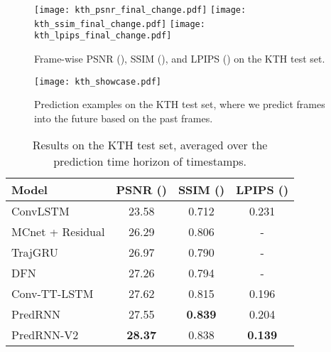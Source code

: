 \documentclass[10pt,journal,compsoc]{IEEEtran}
\let\MYoriglatexcaption\caption
\renewcommand{\caption}[2][\relax]{\MYoriglatexcaption[#2]{#2}}
\begin{document}
\begin{figure*}[t]
  \centering
{
    \texttt{[image: kth\_psnr\_final\_change.pdf]}
  }
  \hfil
{
    \texttt{[image: kth\_ssim\_final\_change.pdf]}
}
\hfil
{
    \texttt{[image: kth\_lpips\_final\_change.pdf]}
}
\caption{Frame-wise PSNR (), SSIM (), and LPIPS () on the KTH test set.}
\label{fig:kth_frame}
\vspace{5pt}
\end{figure*}


\begin{figure*}[t]
  \centering
  \texttt{[image: kth\_showcase.pdf]}
\caption{Prediction examples on the KTH test set, where we predict  frames into the future based on the past  frames.}
  \label{fig:kth_results}
  \vspace{5pt}
\end{figure*} 



\begin{table}[h]
\vspace{5pt}
  \caption{Results on the KTH test set, averaged over the prediction time horizon of  timestamps. }
  \vskip -0.05in
  \label{tab:kth}
  \centering
  \begin{tabular}{lccc}
    \toprule
    Model & PSNR () & SSIM () & LPIPS ()  \\
    \midrule
    ConvLSTM \cite{shi2015convolutional} & 23.58 & 0.712 & 0.231 \\
    MCnet + Residual \cite{Villegas2017Decomposing} & 26.29 & 0.806 & - \\
    TrajGRU \cite{shi2017deep} & 26.97 & 0.790 & - \\
    DFN \cite{de2016dynamic} & 27.26 & 0.794 & - \\
    Conv-TT-LSTM \cite{su2020convolutional} & 27.62 & 0.815 & 0.196 \\
    \midrule
    PredRNN & 27.55 & \textbf{0.839} & 0.204  \\
    PredRNN-V2 & \textbf{28.37} & 0.838 & \textbf{0.139}  \\
    \bottomrule
  \end{tabular}
  \vspace{-5pt}
\end{table}
\end{document}
